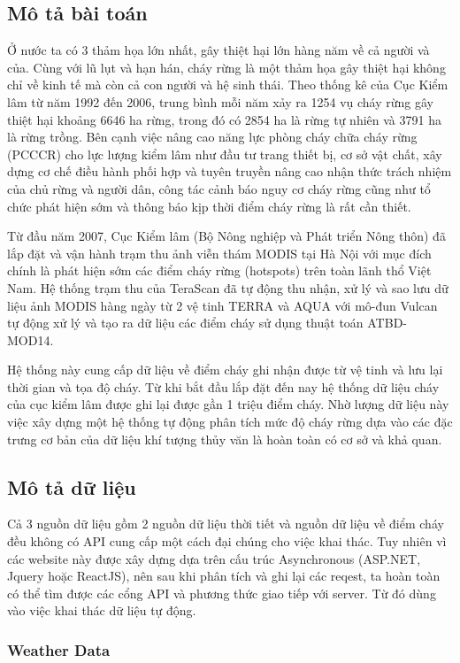 \documentclass{article}
\begin{document}
\subsection{Mô tả bài toán}
\qquad Ở nước ta có 3 thảm họa lớn nhất, gây thiệt hại lớn hàng năm về cả người và của. Cùng với lũ lụt và hạn hán, cháy rừng là một thảm họa gây thiệt hại không chỉ về kinh tế mà còn cả con người và hệ sinh thái. Theo thống kê của Cục Kiểm lâm từ năm 1992 đến 2006, trung bình mỗi năm xảy ra 1254 vụ cháy rừng gây thiệt hại khoảng 6646 ha rừng, trong đó có 2854 ha là rừng tự nhiên và 3791 ha là rừng trồng. Bên cạnh việc nâng cao năng lực phòng cháy chữa cháy rừng (PCCCR) cho lực lượng kiểm lâm như đầu tư trang thiết bị, cơ sở vật chất, xây dựng cơ chế điều hành phối hợp và tuyên truyền nâng cao nhận thức trách nhiệm của chủ rừng và người dân, công tác cảnh báo nguy cơ cháy rừng cũng như tổ chức phát hiện sớm và thông báo kịp thời điểm cháy rừng là rất cần thiết.

Từ đầu năm 2007, Cục Kiểm lâm (Bộ Nông nghiệp và Phát triển Nông thôn) đã lắp đặt và vận hành trạm thu ảnh viễn thám MODIS tại Hà Nội với mục đích chính là phát hiện sớm các điểm cháy rừng (hotspots) trên toàn lãnh thổ Việt Nam. Hệ thống trạm thu của TeraScan đã tự động thu nhận, xử lý và sao lưu dữ liệu ảnh MODIS hàng ngày từ 2 vệ tinh TERRA và AQUA với mô-đun Vulcan tự động xử lý và tạo ra dữ liệu các điểm cháy sử dụng thuật toán ATBD-MOD14.

Hệ thống này cung cấp dữ liệu về điểm cháy ghi nhận được từ vệ tinh và lưu lại thời gian và tọa độ cháy. Từ khi bắt đầu lắp đặt đến nay hệ thống dữ liệu cháy của cục kiểm lâm được ghi lại được gần 1 triệu điểm cháy. Nhờ lượng dữ liệu này việc xây dựng một hệ thống tự động phân tích mức độ cháy rừng dựa vào các đặc trưng cơ bản của dữ liệu khí tượng thủy văn là hoàn toàn có cơ sở và khả quan.

\subsection{Mô tả dữ liệu}
\qquad Cả 3 nguồn dữ liệu gồm 2 nguồn dữ liệu thời tiết và nguồn dữ liệu về điểm cháy đều không có API cung cấp một cách đại chúng cho việc khai thác. Tuy nhiên vì các website này được xây dựng dựa trên cấu trúc Asynchronous (ASP.NET, Jquery hoặc ReactJS), nên sau khi phân tích và ghi lại các reqest, ta hoàn toàn có thể tìm được các cổng API và phương thức giao tiếp với server. Từ đó dùng vào việc khai thác dữ liệu tự động.

\subsubsection{Weather Data}
\end{document}
